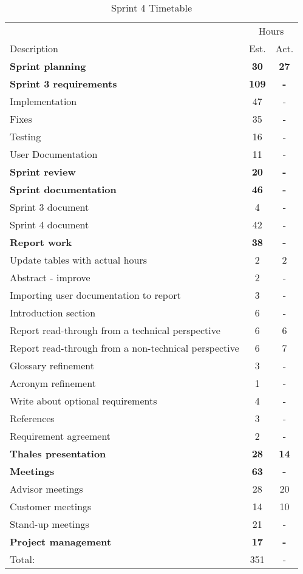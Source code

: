 \begin{table}[!htb] \small \center
\caption{Sprint 4 Timetable\label{tab:sprint4time}}
\begin{tabularx}{\textwidth}{X c c}
	\toprule
	& \multicolumn{2}{c}{Hours} \\
	\cmidrule(r){2-3}
	Description & Est. & Act. \\
	\midrule
	\textbf{Sprint planning} & \textbf{30} & \textbf{27} \\
	\addlinespace
	\textbf{Sprint 3 requirements} & \textbf{109} & \textbf{-} \\
	Implementation & 47 & - \\
	Fixes & 35 & - \\
	Testing & 16 & - \\
	User Documentation & 11 & - \\
	\addlinespace
	\textbf{Sprint review} & \textbf{20} & \textbf{-} \\
	\addlinespace
	\textbf{Sprint documentation} & \textbf{46} & \textbf{-} \\
	Sprint 3 document & 4 & - \\
	Sprint 4 document & 42 & - \\
	\addlinespace
	\textbf{Report work} & \textbf{38} & \textbf{-} \\
	Update tables with actual hours & 2 & 2 \\
	Abstract - improve & 2 & -\\
	Importing user documentation to report & 3 & -\\
	Introduction section & 6 & -\\
	Report read-through from a technical perspective & 6 & 6\\
	Report read-through from a non-technical perspective & 6 & 7\\
	Glossary refinement & 3 & -\\
	Acronym refinement & 1 & -\\
	Write about optional requirements & 4 & -\\
	References & 3 & -\\
	Requirement agreement & 2 & -\\
	\addlinespace
	\textbf{Thales presentation} & \textbf{28} & \textbf{14} \\
	\addlinespace
	\textbf{Meetings} & \textbf{63} & \textbf{-} \\
	Advisor meetings & 28 & 20 \\
	Customer meetings & 14 & 10 \\
	Stand-up meetings & 21 & - \\
	\addlinespace
	\textbf{Project management} & \textbf{17} & \textbf{-} \\
	\midrule
	Total: & 351 & - \\
	\bottomrule
\end{tabularx}
\end{table}

